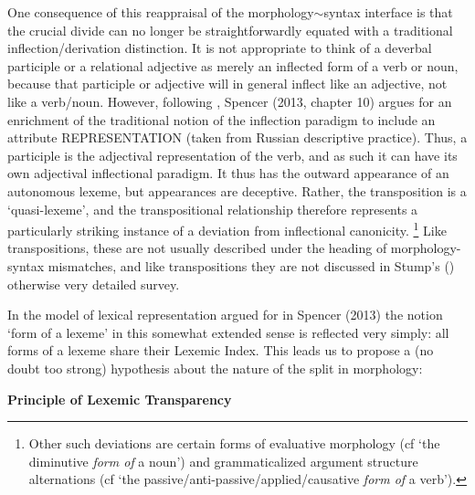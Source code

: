 \documentclass[output=paper,
modfonts
]{LSP/langsci}
\begin{document}
One consequence of this reappraisal of the morphology$\sim$syntax interface is that the crucial divide can no longer be straightforwardly equated with a traditional inflection/derivation distinction. It is not appropriate to think of a deverbal participle or a relational adjective as merely an inflected form of a verb or noun, because that participle or adjective will in general inflect like an adjective, not like a verb/noun.  However, following \textcite{Haspelmath96}, Spencer (2013, chapter 10) argues for an enrichment of the traditional notion of the inflection paradigm to include an attribute REPRESENTATION (taken from Russian descriptive practice). Thus, a participle is the adjectival representation of the verb, and as such it can have its own adjectival inflectional paradigm. It thus has the outward appearance of an autonomous lexeme, but appearances are deceptive. Rather, the transposition is a ‘quasi-lexeme’, \label{quasilexeme} and the transpositional relationship therefore represents a particularly striking instance of a deviation from inflectional canonicity.%
\footnote{Other such deviations are certain forms of evaluative morphology (cf ‘the diminutive \emph{form of} a noun’) and grammaticalized argument structure alternations (cf ‘the passive/anti-passive/applied/causative \emph{form of} a verb’).} %
Like transpositions, these are not usually described under the heading of morphology-syntax mismatches, and like transpositions they are not discussed in Stump’s (\citeyear*{Stump16:book}) otherwise very detailed survey. 

In the model of lexical representation argued for in Spencer (2013) the notion ‘form of a lexeme’ in this somewhat extended sense is reflected very simply: all forms of a lexeme share their Lexemic Index. This leads us to propose a (no doubt too strong) hypothesis about the nature of the split in morphology: \medskip

\noindent

\textbf{Principle of Lexemic Transparency}
\end{document}
